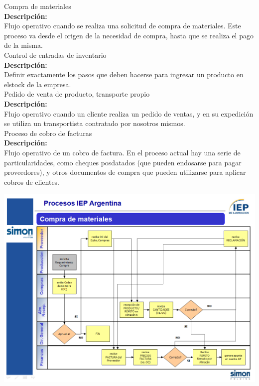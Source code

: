 {\large{Compra de materiales}} \\
{\bf{Descripción:}} \\
Flujo operativo cuando se realiza una solicitud de compra de materiales. Este proceso va desde el origen de la necesidad de compra, hasta que se realiza el pago de la misma. \\

{\large{Control de entradas de inventario}} \\
{\bf{Descripción:}} \\
Definir exactamente los pasos que deben hacerse para ingresar un producto en elstock de la empresa. \\

{\large{Pedido de venta de producto, transporte propio}} \\
{\bf{Descripción:}} \\
Flujo operativo cuando un cliente realiza un pedido de ventas, y en su expedición se utiliza un transportista contratado por nosotros mismos. \\

{\large{Proceso de cobro de facturas}} \\
{\bf{Descripción:}} \\
Flujo operativo de un cobro de factura. En el proceso actual hay una serie de particularidades, como cheques posdatados (que pueden endosarse para pagar proveedores), y otros documentos de compra que pueden utilizarse para aplicar cobros de clientes.


\begin{center}
 \includegraphics[angle=90,scale=0.80,keepaspectratio=true]{./Images/Procesos-Circuitos-Originales-IEP/Circuito-Compras-IEP.PNG}
\end{center}

